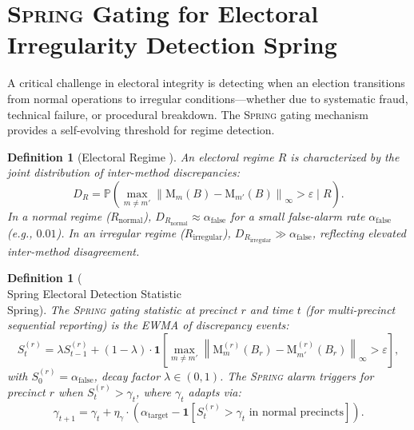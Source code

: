 \documentclass[11pt,a4paper]{article}
\newtheorem{definition}[theorem]{Definition}
\theoremstyle{definition}
\newcommand{\Spring}{\textsc{Spring}}
\newcommand{\Pbb}{\mathbb{P}}
\newcommand{\ind}[1]{\mathbf{1}[#1]}
\newcommand{\norm}[1]{\left\lVert#1\right\rVert}
\newcommand{\method}[1]{\mathrm{M}_{#1}}
\begin{document}
\section{\Spring{} Gating for Electoral Irregularity Detection Spring}
\label{sec:spring}
A critical challenge in electoral integrity is detecting when an election transitions from normal operations to irregular conditions---whether due to systematic fraud, technical failure, or procedural breakdown. The \Spring{} gating mechanism~\cite{SCX2025} provides a self-evolving threshold for regime detection.
\begin{definition}[Electoral Regime ]
\label{def:electoral_regime}
An electoral regime $R$ is characterized by the joint distribution of inter-method discrepancies:
\begin{equation}
    D_R = \Pbb(\max_{m \neq m'} \norm{\method{m}(B) - \method{m'}(B)}_\infty > \varepsilon \mid R).
    \label{eq:electoral_regime_def}
\end{equation}
In a normal regime ($R_{\text{normal}}$), $D_{R_{\text{normal}}} \approx \alpha_{\text{false}}$ for a small false-alarm rate $\alpha_{\text{false}}$ (e.g., $0.01$). In an irregular regime ($R_{\text{irregular}}$), $D_{R_{\text{irregular}}} \gg \alpha_{\text{false}}$, reflecting elevated inter-method disagreement.
\end{definition}
\begin{definition}[\\Spring{} Electoral Detection Statistic \\Spring{}]
\label{def:spring_electoral}
The \Spring{} gating statistic at precinct $r$ and time $t$ (for multi-precinct sequential reporting) is the EWMA of discrepancy events:
\begin{equation}
    S_t^{(r)} = \lambda S_{t-1}^{(r)} + (1 - \lambda) \cdot \ind{\max_{m \neq m'} \norm{\method{m}^{(r)}(B_r) - \method{m'}^{(r)}(B_r)}_\infty > \varepsilon},
    \label{eq:spring_electoral_stat}
\end{equation}
with $S_0^{(r)} = \alpha_{\text{false}}$, decay factor $\lambda \in (0, 1)$. The \Spring{} alarm triggers for precinct $r$ when $S_t^{(r)} > \gamma_t$, where $\gamma_t$ adapts via:
\begin{equation}
    \gamma_{t+1} = \gamma_t + \eta_\gamma \cdot (\alpha_{\text{target}} - \ind{S_t^{(r)} > \gamma_t \text{ in normal precincts}}).
    \label{eq:spring_threshold_electoral}
\end{equation}
\end{definition}
\end{document}
